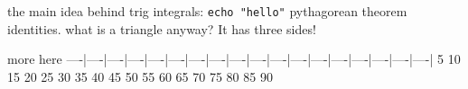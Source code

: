 the main idea behind trig integrals:
\texttt{echo "hello"}
pythagorean theorem identities. what is a triangle anyway? It has
three sides!

more here
----|----|----|----|----|----|----|----|----|----|----|----|----|----|----|----|----|----|
   5   10   15   20   25   30   35   40   45   50   55   60   65   70   75   80   85   90